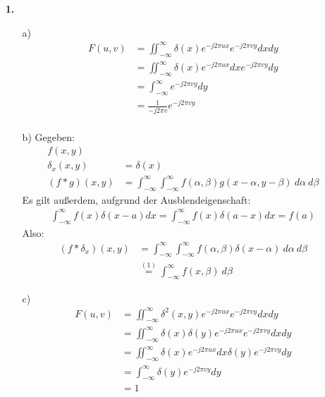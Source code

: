 \documentclass[a4paper,11pt]{article}
\author{\authorinfotitle}
\title{\titleinfo}
\date{\today}
\begin{document}
	\maketitle
	\begin{enumerate}
		\item[\textbf{1.}]
			\begin{enumerate}
				\item[a)]
					\begin{align*}
					F(u,v) &= \iint_{-\infty}^{\infty}\delta(x)e^{-j2\pi ux}e^{-j2\pi vy}dx dy\\
					&=\iint_{-\infty}^{\infty}\delta(x)e^{-j2\pi ux}dx e^{-j2\pi vy}dy\\
					&=\int_{-\infty}^{\infty} e^{-j2\pi vy}dy\\
					&= \frac{1}{-j2\pi v} e^{-j2\pi vy}\\
					\end{align*}
				\item[b)]
					Gegeben:
					\begin{align*}
						f(x, y)& \\
						\delta_x(x, y) &= \delta(x) \\
						(f * g)(x, y) &= \int_{-\infty}^{\infty} \int_{-\infty}^{\infty} f(\alpha, \beta) g(x - \alpha, y - \beta) \ d\alpha \ d\beta
					\end{align*}
					Es gilt außerdem, aufgrund der Ausblendeigenschaft:
					\begin{align}
						\int_{-\infty}^{\infty} f(x) \delta(x - a) dx = \int_{-\infty}^{\infty} f(x) \delta(a - x) dx = f(a)
					\end{align}
					Also:
					\begin{align*}
						(f * \delta_x)(x, y) &= \int_{-\infty}^{\infty} \int_{-\infty}^{\infty} f(\alpha, \beta) \delta(x - \alpha) \ d\alpha \ d\beta \\
						 &\overset{(1)}{=} \int_{-\infty}^{\infty} f(x, \beta) \ d\beta
					\end{align*}
				\item[c)]
					\begin{align*}
					F(u,v) &= \iint_{-\infty}^{\infty}\delta^2(x,y)e^{-j2\pi ux}e^{-j2\pi vy}dx dy\\
					&= \iint_{-\infty}^{\infty}\delta(x)\delta(y)e^{-j2\pi ux}e^{-j2\pi vy}dx dy\\
					&=\iint_{-\infty}^{\infty}\delta(x)e^{-j2\pi ux}dx \delta(y)e^{-j2\pi vy}dy\\
					&=\int_{-\infty}^{\infty} \delta(y)e^{-j2\pi vy}dy\\
					&= 1\\
					\end{align*}
			\end{enumerate}
	\end{enumerate}
\end{document}
